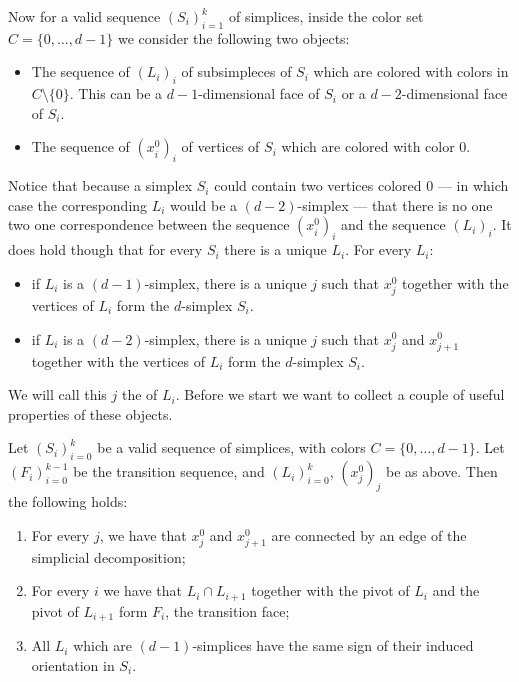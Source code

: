 Now for a valid sequence $\left(S_i\right)_{i=1}^{k}$ of simplices, inside the color set $C = \{0, \dots, d-1\}$ we consider the following two objects:
\begin{itemize}
    \item The sequence of $(L_i)_{i}$ of subsimpleces of $S_i$ which are colored with colors in $C \setminus \{0\}$. This can be a $d-1$-dimensional face of $S_i$ or a $d-2$-dimensional face of $S_i$.
    \item The sequence of $(x_i^0)_{i}$ of vertices of $S_i$ which are colored with color $0$.
\end{itemize}
Notice that because a simplex $S_i$ could contain two vertices colored $0$ --- in which case the corresponding $L_i$ would be a $(d-2)$-simplex --- that there is no one two one correspondence between the sequence $(x_i^0)_i$ and the sequence $(L_i)_i$. It does hold though that for every $S_i$ there is a unique $L_i$. For every $L_i$:
\begin{itemize}
    \item if $L_i$ is a $(d-1)$-simplex, there is a unique $j$ such that $x_j^0$ together with the vertices of $L_i$ form the $d$-simplex $S_i$.
    \item if $L_i$ is a $(d-2)$-simplex, there is a unique $j$ such that $x_j^0$ and $x_{j+1}^0$ together with the vertices of $L_i$ form the $d$-simplex $S_i$.
\end{itemize}
We will call this $j$ the  of $L_i$. Before we start we want to collect a couple of useful properties of these objects.
\begin{proposition}
    Let $(S_i)_{i=0}^k$ be a valid sequence of simplices, with colors $C = \{0, \dots, d-1\}$. Let $(F_i)_{i=0}^{k-1}$ be the transition sequence, and $(L_i)_{i=0}^k$, $(x_j^0)_j$ be as above. Then the following holds:
    \begin{enumerate}
        \item For every $j$, we have that $x_j^0$ and $x_{j+1}^0$ are connected by an edge of the simplicial decomposition; \label{prop:connected_by_edge}
        \item For every $i$ we have that $L_i \cap L_{i+1}$ together with the pivot of $L_i$ and the pivot of $L_{i+1}$ form $F_i$, the transition face;
        \item All $L_i$ which are $(d-1)$-simplices have the same sign of their induced orientation in $S_i$.
    \end{enumerate}
\end{proposition}
